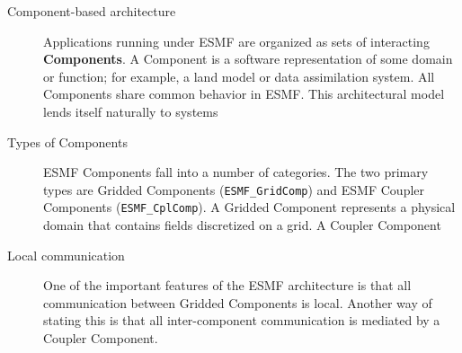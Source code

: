 \begin{description}
\item[Component-based architecture]  Applications running under ESMF are organized as sets of interacting 
{\bf Components}.  A Component is
a software representation of some domain or function; for example, a land model or data assimilation 
system.  All Components share common behavior in ESMF.  This architectural model lends itself naturally to systems 

\item[Types of Components]  ESMF Components fall into a number of categories.  The two primary types are Gridded 
Components ({\tt ESMF\_GridComp}) and ESMF Coupler Components ({\tt ESMF\_CplComp}).  A Gridded Component represents 
a physical domain that contains fields discretized on a grid.  A Coupler Component 

\item[Local communication]

One of the important features of the ESMF architecture is that all communication between Gridded Components is 
local.  Another way of stating this is that all inter-component communication is mediated by a Coupler Component.    
\end{description}









